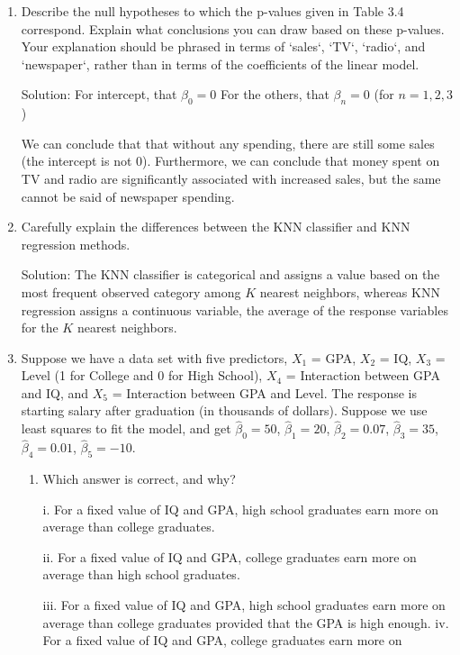 \documentclass{article}
\begin{document}
\begin{enumerate}
\item Describe the null hypotheses to which the p-values given in Table 3.4
 correspond. Explain what conclusions you can draw based on these p-values.
 Your explanation should be phrased in terms of `sales`, `TV`, `radio`, and
 `newspaper`, rather than in terms of the coefficients of the linear model.

Solution: For intercept, that $\beta_0 = 0$
For the others, that $\beta_n = 0$ (for $n = 1, 2, 3$)

We can conclude that that without any spending, there are still some sales (the
intercept is not 0). Furthermore, we can conclude that money spent on TV and
radio are significantly associated with increased sales, but the same cannot be
said of newspaper spending.

\item Carefully explain the differences between the KNN classifier and KNN
 regression methods.

Solution: The KNN classifier is categorical and assigns a value based on the most
frequent observed category among $K$ nearest neighbors, whereas KNN regression
assigns a continuous variable, the average of the response variables for
the $K$ nearest neighbors.

\item Suppose we have a data set with five predictors, $X_1$ = GPA, $X_2$ = IQ,
$X_3$ = Level (1 for College and 0 for High School), $X_4$ = Interaction
 between GPA and IQ, and $X_5$ = Interaction between GPA and Level. The
 response is starting salary after graduation (in thousands of dollars).
 Suppose we use least squares to fit the model, and get $\hat\beta_0 = 50$,
 $\hat\beta_1 = 20$, $\hat\beta_2 = 0.07$, $\hat\beta_3 = 35$, $\hat\beta_4 =
 0.01$, $\hat\beta_5 = -10$.

\begin{enumerate}

\item Which answer is correct, and why?

i. For a fixed value of IQ and GPA, high school graduates earn more on
        average than college graduates.

ii. For a fixed value of IQ and GPA, college graduates earn more on
         average than high school graduates.

iii. For a fixed value of IQ and GPA, high school graduates earn more on
          average than college graduates provided that the GPA is high enough.
iv. For a fixed value of IQ and GPA, college graduates earn more on 


\end{enumerate}
\end{enumerate}
\end{document}
